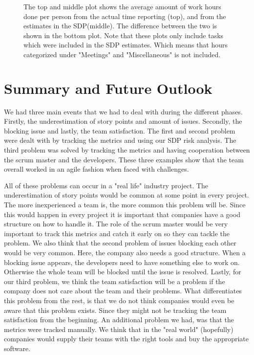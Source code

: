 \documentclass{article}
\begin{document}
\begin{figure}[h!]
    \caption{ The top and middle plot shows the average amount of work hours done per person from the actual time reporting (top), and from the estimates in the SDP\cite{SDP}(middle). The difference between the two is shown in the bottom plot. Note that these plots only include tasks which were included in the SDP estimates. Which means that hours categorized under "Meetings" and "Miscellaneous" is not included.}
    \label{fig:hours}
\end{figure}

\section{Summary and Future Outlook}

We had three main events that we had to deal with during the different phases. Firstly, the underestimation of story points and amount of issues. Secondly, the blocking issue and lastly, the team satisfaction. The first and second problem were dealt with by tracking the metrics and using our SDP risk analysis. The third problem was solved by tracking the metrics and having cooperation between the scrum master and the developers. These three examples show that the team overall worked in an agile fashion when faced with challenges. %

All of these problems can occur in a "real life" industry project. The underestimation of story points would be common at some point in every project. The more inexperienced a team is, the more common this problem will be. Since this would happen in every project it is important that companies have a good structure on how to handle it. The role of the scrum master would be very important to track this metrics and catch it early on so they can tackle the problem. We also think that the second problem of issues blocking each other would be very common. Here, the company also needs a good structure. When a blocking issue appears, the developers need to have something else to work on. Otherwise the whole team will be blocked until the issue is resolved. Lastly, for our third problem, we think the team satisfaction will be a problem if the company does not care about the team and their problems. What differentiates this problem from the rest, is that we do not think companies would even be aware that this problem exists. Since they might not be tracking the team satisfaction from the beginning. An additional problem we had, was that the metrics were tracked manually. We think that in the "real world" (hopefully) companies would supply their teams with the right tools and buy the appropriate software. 
\end{document}

